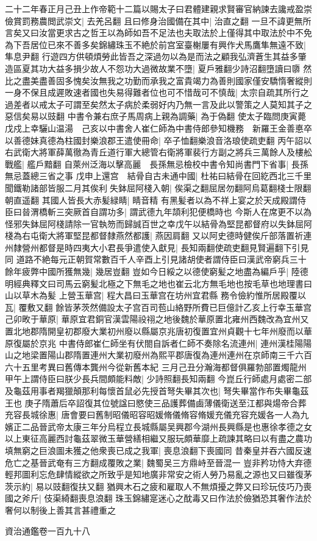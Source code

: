 二十二年春正月己丑上作帝範十二篇以賜太子曰君體建親求賢審官納諫去讒戒盈崇儉賞罰務農閲武崇文|{
	去羌呂翻}
且曰修身治國備在其中|{
	治直之翻}
一旦不諱更無所言矣又曰汝當更求古之哲王以為師如吾不足法也夫取法於上僅得其中取法於中不免為下吾居位已來不善多矣錦繡珠玉不絶於前宫室臺榭屢有興作犬馬鷹隼無遠不致|{
	隼息尹翻}
行遊四方供頓煩勞此皆吾之深過勿以為是而法之顧我弘濟蒼生其益多肇造區夏其功大益多損少故人不怨功大過微故業不墮|{
	夏戶雅翻少詩沼翻墮讀曰隳}
然比之盡美盡善固多愧矣汝無我之功勤而承我之富貴竭力為善則國家僅安驕惰奢縱則一身不保且成遲敗速者國也失易得難者位也可不惜哉可不慎哉|{
	太宗自疏其所行之過差者以戒太子可謂至矣然太子病於柔弱好内乃無一言及此以警策之人莫知其子之惡信矣易以豉翻}
中書令兼右庶子馬周病上親為調藥|{
	為于偽翻}
使太子臨問庚寅薨戊戍上幸驪山温湯　己亥以中書舍人崔仁師為中書侍郎參知機務　新羅王金善悳卒以善德妹真德為柱國封樂浪郡王遣使冊命|{
	卒子恤翻樂浪音洛琅使疏吏翻}
丙午詔以右武衛大將軍薛萬徹為青丘道行軍大總管右衛將軍裴行方副之將兵三萬餘人及樓舩戰艦|{
	艦戶黯翻}
自萊州泛海以擊高麗　長孫無忌檢校中書令知尚書門下省事|{
	長孫無忌蓋總三省之事}
戊申上還宫　結骨自古未通中國|{
	杜祐曰結骨在回紇西北三千里}
聞鐵勒諸部皆服二月其俟利失鉢屈阿棧入朝|{
	俟渠之翻屈居勿翻阿烏葛翻棧士限翻朝直遥翻}
其國人皆長大赤髪緑睛|{
	睛音精}
有黑髪者以為不祥上宴之於天成殿謂侍臣曰㫺渭橋斬三突厥首自謂功多|{
	謂武德九年頡利犯便橋時也}
今斯人在席更不以為怪邪失鉢屈阿棧請除一官執笏而歸誠百世之幸戊午以結骨為堅昆都督府以失鉢屈阿棧為右屯衛大將軍堅昆都督隸燕然都護|{
	燕因肩翻}
又以阿史德時健俟斤部落置祈連州隸營州都督是時四夷大小君長爭遣使入獻見|{
	長知兩翻使疏吏翻見賢遍翻下引見同}
道路不絶每元正朝賀常數百千人辛酉上引見諸胡使者謂侍臣曰漢武帝窮兵三十餘年疲弊中國所獲無幾|{
	幾居豈翻}
豈如今日綏之以德使窮髪之地盡為編戶乎|{
	陸德明經典釋文曰司馬云窮髪北極之下無毛之地也崔云北方無毛地也按毛草也地理書曰山以草木為髪}
上營玉華宫|{
	程大昌曰玉華宫在坊州宜君縣}
務令儉約惟所居殿覆以瓦|{
	覆敷又翻}
餘皆茅茨然備設太子宫百司苞山絡野所費已巨億計乙亥上行幸玉華宫己卯畋于華原|{
	華原宜君銅官漢雲陽祋祤之地後魏於華原置北雍州西魏改為宜州又置北地郡隋開皇初郡廢大業初州廢以縣屬京兆唐初復置宜州貞觀十七年州廢而以華原復屬於京兆}
中書侍郎崔仁師坐有伏閤自訴者仁師不奏除名流連州|{
	連州漢桂陽陽山之地梁置陽山郡隋置連州大業初廢州為熙平郡唐復為連州連州在京師南三千六百六十五里考異曰舊傳本龔州今從新舊本紀}
三月己丑分瀚海都督俱羅勃部置燭龍州　甲午上謂侍臣曰朕少長兵間頗能料敵|{
	少詩照翻長知兩翻}
今崑丘行師處月處密二部及龜茲用事者羯獵顛那利每懷首鼠必先授首弩失畢其次也|{
	弩失畢當作布失畢龜茲王也}
庚子隋蕭后卒詔復其位號諡曰愍使三品護葬備鹵薄儀衛送至江都與煬帝合葬　充容長城徐惠|{
	唐會要曰舊制昭儀昭容昭媛脩儀脩容脩媛充儀充容充媛各一人為九嬪正二品晉武帝太康三年分烏程立長城縣屬吴興郡今湖州長興縣是也惠徐孝德之女}
以上東征高麗西討龜茲翠微玉華營繕相繼又服玩頗華靡上疏諫其略曰以有盡之農功填無窮之巨浪圖未獲之他衆喪已成之我軍|{
	喪息浪翻下喪國同}
昔秦皇并吞六國反速危亡之基晉武奄有三方翻成覆敗之業|{
	魏蜀吴三方鼎峙至晉混一}
豈非矜功恃大弃德輕邦圖利忘危肆情縱欲之所致乎是知地廣非常安之術人勞乃易亂之源也又曰雖復茅茨示約|{
	易以豉翻復扶又翻}
猶興木石之疲和雇取人不無煩擾之弊又曰珍玩伎巧乃喪國之斧斤|{
	伎渠綺翻喪息浪翻}
珠玉錦繡寔迷心之酖毒又曰作法於儉猶恐其奢作法於奢何以制後上善其言甚禮重之

資治通鑑卷一百九十八

